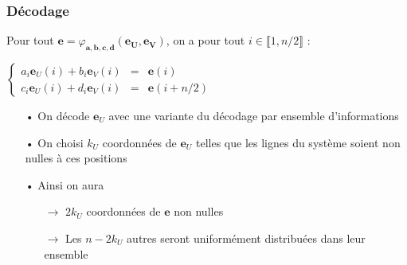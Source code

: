 \documentclass[10pt,a4paper]{beamer}
\theoremstyle{plain}
\theoremstyle{definition}
\newcommand{\e}{\mathbf{e}}
\begin{document}
\begin{frame}
\frametitle{Décodage}

\vspace{0.15in}
\begin{block}{}
Pour tout $\mathbf{e} = \varphi_{\mathbf{a},\mathbf{b},\mathbf{c},\mathbf{d}}(\mathbf{e_U},\mathbf{e_V})$, on a pour tout $i \in \llbracket 1,n/2\rrbracket$ :

\begin{center}
$\left \{
\begin{array}{rcl}
a_i\mathbf{e}_U(i) + b_i\mathbf{e}_V(i) &=& \mathbf{e}(i) \\[0.3cm]
c_i\mathbf{e}_U(i) + d_i\mathbf{e}_V(i) &=& \mathbf{e}(i+n/2) 
\end{array}
\right.$
\end{center}
\end{block}

\vspace{0.1in}

\begin{itemize}
\item[•] On décode $\e_U$ avec une variante du décodage par ensemble d'informations
\vspace{0.1in}
\item[•] On choisi $k_U$ coordonnées de $\e_U$ telles que les lignes du système soient non nulles à ces positions
\vspace{0.1in}
\item[•] Ainsi on aura
	\begin{itemize}
	\vspace{0.05in}
	\item[$\rightarrow$] $2k_U$ coordonnées de $\e$ non nulles
	\vspace{0.1in}
	\item[$\rightarrow$] Les $n-2k_U$ autres seront uniformément distribuées dans leur ensemble
	\end{itemize}
\end{itemize}

\end{frame}
\end{document}
